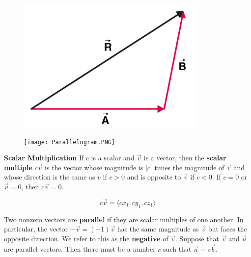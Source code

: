 \documentclass{article}
\begin{document}
            \begin{figure}[h]
                \centering
                \begin{minipage}{.5\textwidth}
                    \centering
                    \includegraphics[scale=0.3]{Resources/Unit3Vectors/Triangle.PNG}
                \end{minipage}%
                \begin{minipage}{.5\textwidth}
                    \centering
                    \texttt{[image: Parallelogram.PNG]}
                \end{minipage}
            \end{figure}

            \noindent \textbf{Scalar Multiplication} If $c$ is a scalar and $\overrightarrow{v}$ is
            a vector, then the \textbf{scalar multiple} $c\overrightarrow{v}$ is the vector whose
            magnitude is $|c|$ times the magnitude of $\overrightarrow{v}$ and whose direction is
            the same as $v$ if $c>0$ and is opposite to $\overrightarrow{v}$ if $c<0$. If $c=0$ or
            $\overrightarrow{v}=0$, then $c\overrightarrow{v}=0$.

            \begin{equation}
                c\overrightarrow{v}=\langle cx_1, cy_1, cz_1 \rangle
            \end{equation}

            \noindent Two nonzero vectors are \textbf{parallel} if they are scalar multiples of one
            another. In particular, the vector $-\overrightarrow{v}=(-1)\overrightarrow{v}$ has the
            same magnitude as $\overrightarrow{v}$ but faces the opposite direction. We refer to
            this as the \textbf{negative} of $\overrightarrow{v}$. Suppose that $\overrightarrow{v}$
            and $\overrightarrow{u}$ are parallel vectors. Then there must be a number $c$ such that
            $\overrightarrow{a}=c\overrightarrow{b}$.
\end{document}
